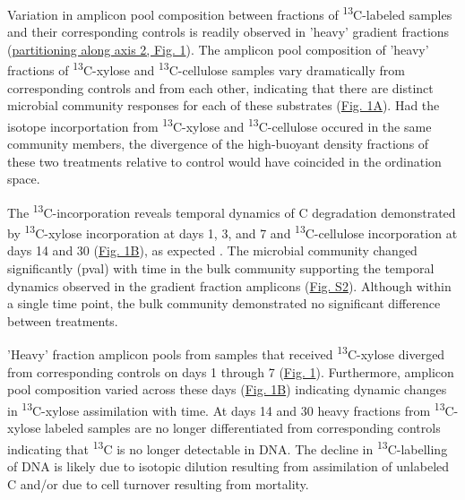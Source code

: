 Variation in amplicon pool composition between fractions of \textsuperscript{13}C-labeled samples and their corresponding controls is readily observed in 'heavy' gradient fractions (\href{https://www.authorea.com/users/3537/articles/3612/master/file/figures/ordination_all1/ordination_all1.png}{partitioning along axis 2, Fig. 1}). The amplicon pool composition of 'heavy' fractions of \textsuperscript{13}C-xylose and \textsuperscript{13}C-cellulose samples vary dramatically from corresponding controls and from each other, indicating that there are distinct microbial community responses for each of these substrates (\href{https://www.authorea.com/users/3537/articles/3612/master/file/figures/ordination_all1/ordination_all1.png}{Fig. 1A}). Had the isotope incorportation from \textsuperscript{13}C-xylose and \textsuperscript{13}C-cellulose occured in the same community members, the divergence of the high-buoyant density fractions of these two treatments relative to control would have coincided in the ordination space.  

The \textsuperscript{13}C-incorporation reveals temporal dynamics of C degradation demonstrated by \textsuperscript{13}C-xylose incorporation at days 1, 3, and 7 and \textsuperscript{13}C-cellulose incorporation at days 14 and 30 (\href{https://www.authorea.com/users/3537/articles/3612/master/file/figures/ordination_all1/ordination_all1.png}{Fig. 1B}), as expected \cite{Amelung_2008}. The microbial community changed significantly (pval) with time in the bulk community supporting the temporal dynamics observed in the gradient fraction amplicons (\href{https://authorea.com/users/3537/articles/8459/master/file/figures/bulk_ordination/bulk_ordination.png}{Fig. S2}). Although within a single time point, the bulk community demonstrated no significant difference between treatments. 

'Heavy' fraction amplicon pools from samples that received \textsuperscript{13}C-xylose diverged from corresponding controls on days 1 through 7 (\href{https://www.authorea.com/users/3537/articles/3612/master/file/figures/ordination_all1/ordination_all1.png}{Fig. 1}). Furthermore, amplicon pool composition varied across these days (\href{https://www.authorea.com/users/3537/articles/3612/master/file/figures/ordination_all1/ordination_all1.png}{Fig. 1B}) indicating dynamic changes in \textsuperscript{13}C-xylose assimilation with time. At days 14 and 30 heavy fractions from \textsuperscript{13}C-xylose labeled samples are no longer differentiated from corresponding controls indicating that \textsuperscript{13}C is no longer detectable in DNA. The decline in \textsuperscript{13}C-labelling of DNA is likely due to isotopic dilution resulting from assimilation of unlabeled C and/or due to cell turnover resulting from mortality. 

